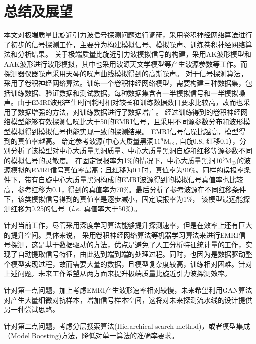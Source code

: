 
\chapter{总结及展望}

本文对极端质量比旋近引力波信号探测问题进行调研，采用卷积神经网络算法进行了初步的信号探测工作，主要分为构建模拟信号、模拟噪声、训练卷积神经网络算法和分析结果。
关于极端质量比旋近引力波模拟信号的构建，采用AK波形模型和AAK波形进行波形模拟，其中也采用波源天文学模型等产生波源参数等工作。而探测器仪器噪声采用天琴的噪声曲线模拟得到的高斯噪声。
对于信号探测算法，采用了卷积神经网络算法。训练一个卷积神经网络模型，需要构建三种数据集，包括训练数据、验证数据和测试数据，每种数据集含有一半模拟信号和一半模拟噪声。由于EMRI波形产生时间耗时相对较长和训练数据数目要求比较高，故而也采用了数据增强的方法，对训练数据进行了数据增广。
经过训练得到的卷积神经网络模型能够有效探测信噪比大于50的EMRI信号，且采用不同源参数分布和波形模型模拟得到模拟信号也能实现一致的探测结果。
EMRI信号信噪比越高，模型得到的真值率越高。
给定参考波源(中心大质量黑洞$10^6 \rm M_{\odot}$, 自旋0.8, 红移0.1），分别分析了该模型对中心大质量黑洞质量、中心大质量黑洞自旋和红移等源参数不同的模拟信号的灵敏度。
在固定误报率为1\%的情况下，中心大质量黑洞$10^6\rm M_{\odot}$的波源模拟的EMRI信号真值率最高；且红移为0.1时，真值率为90\%。同样的误报率条件下，带有自旋中心大质量黑洞构成的EMRI波源得到的模拟信号真值率也比较高，参考红移为0.1，得到的真值率为70\%。最后分析了参考波源在不同红移条件下，该类模拟信号得到的真值率是逐步减小，固定误报率为1\%， 该模型最远能探测红移为0.25的信号（$\emph{i.e.}$ 真值率大于50\%）。



针对当前工作，尽管采用深度学习算法能够提升探测速率，但是在效率上还有巨大的提升空间。具体来说，
采用卷积神经网络算法等机器学习算法来进行EMRI信号探测，这是基于数据驱动的方法，优点是避免了人工分析特征统计量的工作，实现了自动提取信号特征，由此达到端到端的处理过程。同时，也因为是数据驱动整个模型实现过程，故而需要大量的数据，且模型复杂度较高，训练相对困难。针对上述问题，未来工作希望从两方面来提升极端质量比旋近引力波探测效率。

针对第一点问题，加上考虑EMRI产生波形速率相对较慢，未来希望利用GAN算法对产生大量细微对抗样本，增加信号样本空间，这将对未来探测流水线的设计提供另一种尝试思路。

针对第二点问题，考虑分层搜索算法(Hierarchical search method)，或者模型集成（Model Boosting)方法，降低对单一算法的准确率要求。
